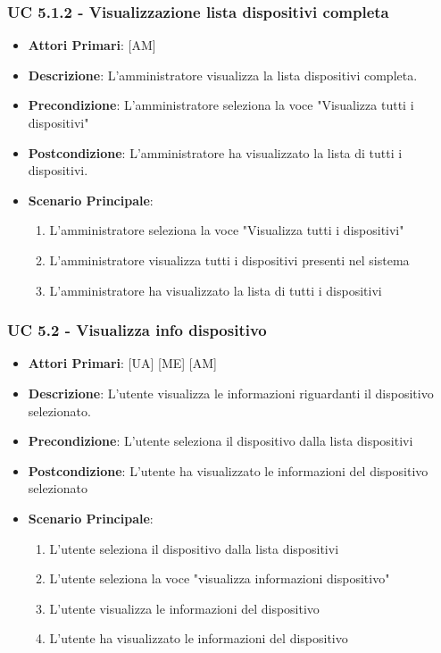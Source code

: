 			\subsubsection{UC 5.1.2 - Visualizzazione lista dispositivi completa}
			\begin{itemize}
				\item \textbf{Attori Primari}: [AM]
				\item \textbf{Descrizione}: L'amministratore visualizza la lista dispositivi completa.
				\item \textbf{Precondizione}: L'amministratore seleziona la voce "Visualizza tutti i dispositivi"
				\item \textbf{Postcondizione}: L'amministratore ha visualizzato la lista di tutti i dispositivi.
				\item \textbf{Scenario Principale}:
				\begin{enumerate}
					\item{L'amministratore seleziona la voce "Visualizza tutti i dispositivi"}
					\item{L'amministratore visualizza tutti i dispositivi presenti nel sistema}
					\item{L'amministratore ha visualizzato la lista di tutti i dispositivi}
				\end{enumerate}
			\end{itemize}
			
			\subsubsection{UC 5.2 - Visualizza info dispositivo}
			\begin{itemize}
				\item \textbf{Attori Primari}: [UA] [ME] [AM]
				\item \textbf{Descrizione}: L'utente visualizza le informazioni riguardanti il dispositivo selezionato.
				\item \textbf{Precondizione}: L'utente seleziona il dispositivo dalla lista dispositivi
				\item \textbf{Postcondizione}: L'utente ha visualizzato le informazioni del dispositivo selezionato
				\item \textbf{Scenario Principale}:
				\begin{enumerate}
					\item{L'utente seleziona il dispositivo dalla lista dispositivi}
					\item{L'utente seleziona la voce "visualizza informazioni dispositivo"}
					\item{L'utente visualizza le informazioni del dispositivo}
					\item{L'utente ha visualizzato le informazioni del dispositivo}
				\end{enumerate}
			\end{itemize}
			
